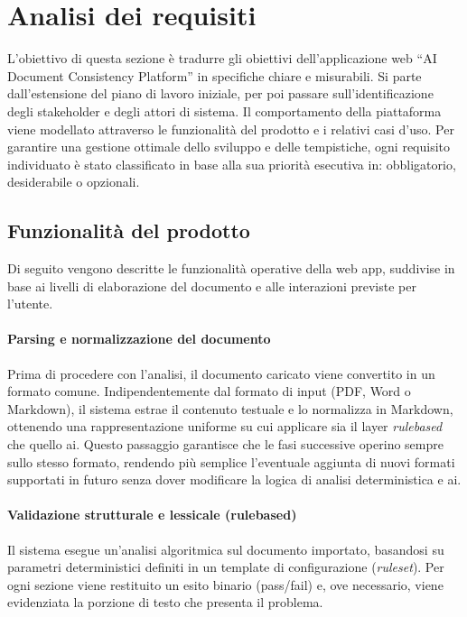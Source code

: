 \chapter{Analisi dei requisiti}
\label{cap:analisi_requisiti}

L’obiettivo di questa sezione è tradurre gli obiettivi dell’applicazione web “AI Document Consistency Platform” in specifiche chiare e misurabili. Si parte dall'estensione del piano di lavoro iniziale, per poi passare sull'identificazione degli stakeholder e degli attori di sistema. Il comportamento della piattaforma viene modellato attraverso le funzionalità del prodotto e i relativi casi d'uso. Per garantire una gestione ottimale dello sviluppo e delle tempistiche, ogni requisito individuato è stato classificato in base alla sua priorità esecutiva in: obbligatorio, desiderabile o opzionali.

\section{Funzionalità del prodotto}
Di seguito vengono descritte le funzionalità operative della web app, suddivise in base ai livelli di elaborazione del documento e alle interazioni previste per l'utente. 

\subsubsection{Parsing e normalizzazione del documento}
Prima di procedere con l'analisi, il documento caricato viene convertito in un formato comune. Indipendentemente dal formato di input (PDF, Word o Markdown), il sistema estrae il contenuto testuale e lo normalizza in Markdown, ottenendo una rappresentazione uniforme su cui applicare sia il layer {\emph{\gls{rulebased}}\glsfirstoccur} che quello \gls{ai}. Questo passaggio garantisce che le fasi successive operino sempre sullo stesso formato, rendendo più semplice l'eventuale aggiunta di nuovi formati supportati in futuro senza dover modificare la logica di analisi deterministica e \gls{ai}.

\subsubsection{Validazione strutturale e lessicale (\gls{rulebased})}
Il sistema esegue un'analisi algoritmica sul documento importato, basandosi su parametri deterministici definiti in un template di configurazione (\emph{ruleset}). Per ogni sezione viene restituito un esito binario (pass/fail) e, ove necessario, viene evidenziata la porzione di testo che presenta il problema.\\

